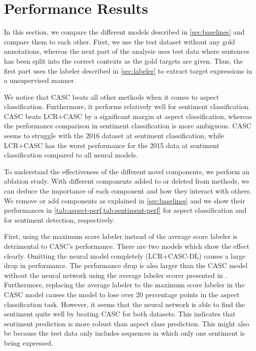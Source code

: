 \documentclass[american, oneside]{ecsgdp}
\begin{document}


\section{Performance Results} \label{sec:performance}
In this section, we compare the different models described in \cref{sec:baselines} and compare them to each other. First, we use the test dataset without any gold annotations, whereas the next part of the analysis uses test data where sentences has been split into the correct contexts as the gold targets are given. Thus, the first part uses the labeler described in \cref{sec:labeler} to extract target expressions in a unsupervised manner.

We notice that CASC beats all other methods when it comes to aspect classification. Furthermore, it performs relatively well for sentiment classification. CASC beats LCR+CASC by a significant margin at aspect classification, whereas the performance comparison in sentiment classification is more ambiguous. CASC seems to struggle with the 2016 dataset at sentiment classification, while LCR+CASC has the worst performance for the 2015 data at sentiment classification compared to all neural models.

To understand the effectiveness of the different novel components, we perform an ablation study. With different components added to or deleted from methods, we can deduce the importance of each component and how they interact with others. We remove or add components as explained in \cref{sec:baselines} and we show their performances in \cref{tab:aspect-perf,tab:sentiment-perf} for aspect classification and for sentiment detection, respectively.

First, using the maximum score labeler instead of the average score labeler is detrimental to CASC's performance. There are two models which show the effect clearly. Omitting the neural model completely (LCR+CASC-DL) causes a large drop in performance. The performance drop is also larger than the CASC model without the neural network using the average labeler scorer presented in \textcite{Kumar2021CASC}. Furthermore, replacing the average labeler to the maximum score labeler in the CASC model causes the model to lose over 20 percentage points in the aspect classification task. However, it seems that the neural network is able to find the sentiment quite well by beating CASC for both datasets. This indicates that sentiment prediction is more robust than aspect class prediction. This might also be because the test data only includes sequences in which only one sentiment is being expressed.
\end{document}
